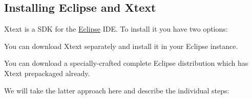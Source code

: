 \subsection{Installing Eclipse and Xtext}

Xtext is a SDK for the \href{http://www.eclipse.org/}{Eclipse} IDE. To
install it you have two options:

\begin{compactitem}
    \item You can download Xtext separately and install it in your Eclipse
    instance.
    \item You can download a specially-crafted complete Eclipse distribution
    which has Xtext prepackaged already.
\end{compactitem}

We will take the latter approach here and describe the individual steps:

